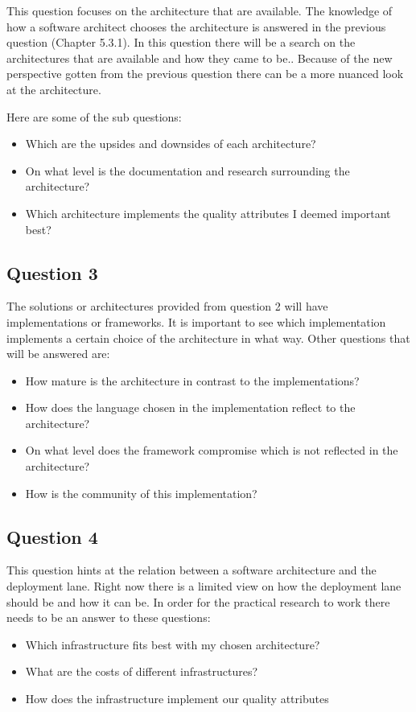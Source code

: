 This question focuses on the architecture that are available. The knowledge of how a software architect chooses the architecture is answered in the previous question (Chapter 5.3.1). In this question there will be a search on the architectures that are available and how they came to be.. Because of the new perspective gotten from the previous question there can be a more nuanced look at the architecture.

Here are some of the sub questions:
\begin{itemize}
	\item Which are the upsides and downsides of each architecture?
	\item On what level is the documentation and research surrounding the architecture?
	\item Which architecture implements the quality attributes I deemed important best?
\end{itemize}

\subsection{Question 3}

The solutions or architectures provided from question 2 will have implementations or frameworks. It is important to see which implementation implements a certain choice of the architecture in what way. Other questions that will be answered are:
\begin{itemize}
	\item How mature is the architecture in contrast to the implementations?
	\item How does the language chosen in the implementation reflect to the architecture?
	\item On what level does the framework compromise which is not reflected in the architecture?
	\item How is the community of this implementation?
\end{itemize}

\subsection{Question 4}


This question hints at the relation between a software architecture and the deployment lane. Right now there is a limited view on how the deployment lane should be and how it can be. In order for the practical research to work there needs to be an answer to these questions:
\begin{itemize}
	\item Which infrastructure fits best with my chosen architecture?
	\item What are the costs of different infrastructures?
	\item How does the infrastructure implement our quality attributes
\end{itemize}
